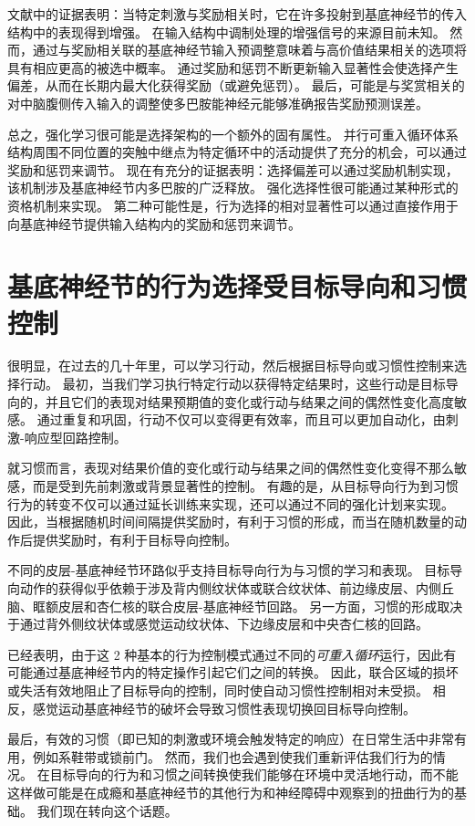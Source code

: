 文献中的证据表明：当特定刺激与奖励相关时，它在许多投射到基底神经节的传入结构中的表现得到增强。
在输入结构中调制处理的增强信号的来源目前未知。
然而，通过与奖励相关联的基底神经节输入预调整意味着与高价值结果相关的选项将具有相应更高的被选中概率。
通过奖励和惩罚不断更新输入显著性会使选择产生偏差，从而在长期内最大化获得奖励（或避免惩罚）。
最后，可能是与奖赏相关的对中脑腹侧传入输入的调整使多巴胺能神经元能够准确报告奖励预测误差。


总之，强化学习很可能是选择架构的一个额外的固有属性。
并行可重入循环体系结构周围不同位置的突触中继点为特定循环中的活动提供了充分的机会，可以通过奖励和惩罚来调节。
现在有充分的证据表明：选择偏差可以通过奖励机制实现，该机制涉及基底神经节内多巴胺的广泛释放。
强化选择性很可能通过某种形式的资格机制来实现。
第二种可能性是，行为选择的相对显著性可以通过直接作用于向基底神经节提供输入结构内的奖励和惩罚来调节。



\section{基底神经节的行为选择受目标导向和习惯控制}

很明显，在过去的几十年里，可以学习行动，然后根据目标导向或习惯性控制来选择行动。
最初，当我们学习执行特定行动以获得特定结果时，这些行动是目标导向的，并且它们的表现对结果预期值的变化或行动与结果之间的偶然性变化高度敏感。
通过重复和巩固，行动不仅可以变得更有效率，而且可以更加自动化，由刺激-响应型回路控制。


就习惯而言，表现对结果价值的变化或行动与结果之间的偶然性变化变得不那么敏感，而是受到先前刺激或背景显著性的控制。
有趣的是，从目标导向行为到习惯行为的转变不仅可以通过延长训练来实现，还可以通过不同的强化计划来实现。
因此，当根据随机时间间隔提供奖励时，有利于习惯的形成，而当在随机数量的动作后提供奖励时，有利于目标导向控制。


不同的皮层-基底神经节环路似乎支持目标导向行为与习惯的学习和表现。
目标导向动作的获得似乎依赖于涉及背内侧纹状体或联合纹状体、前边缘皮层、内侧丘脑、眶额皮层和杏仁核的联合皮层-基底神经节回路。
另一方面，习惯的形成取决于通过背外侧纹状体或感觉运动纹状体、下边缘皮层和中央杏仁核的回路。


已经表明，由于这 2 种基本的行为控制模式通过不同的\textit{可重入循环}运行，因此有可能通过基底神经节内的特定操作引起它们之间的转换。
因此，联合区域的损坏或失活有效地阻止了目标导向的控制，同时使自动习惯性控制相对未受损。
相反，感觉运动基底神经节的破坏会导致习惯性表现切换回目标导向控制。


最后，有效的习惯（即已知的刺激或环境会触发特定的响应）在日常生活中非常有用，例如系鞋带或锁前门。
然而，我们也会遇到使我们重新评估我们行为的情况。
在目标导向的行为和习惯之间转换使我们能够在环境中灵活地行动，而不能这样做可能是在成瘾和基底神经节的其他行为和神经障碍中观察到的扭曲行为的基础。
我们现在转向这个话题。



